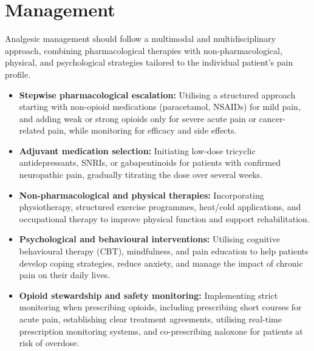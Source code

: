 \section*{Management}
Analgesic management should follow a multimodal and multidisciplinary approach, combining pharmacological therapies with non-pharmacological, physical, and psychological strategies tailored to the individual patient's pain profile.
\begin{itemize}
    \item \textbf{Stepwise pharmacological escalation:} Utilising a structured approach starting with non-opioid medications (paracetamol, NSAIDs) for mild pain, and adding weak or strong opioids only for severe acute pain or cancer-related pain, while monitoring for efficacy and side effects.
    \item \textbf{Adjuvant medication selection:} Initiating low-dose tricyclic antidepressants, SNRIs, or gabapentinoids for patients with confirmed neuropathic pain, gradually titrating the dose over several weeks.
    \item \textbf{Non-pharmacological and physical therapies:} Incorporating physiotherapy, structured exercise programmes, heat/cold applications, and occupational therapy to improve physical function and support rehabilitation.
    \item \textbf{Psychological and behavioural interventions:} Utilising cognitive behavioural therapy (CBT), mindfulness, and pain education to help patients develop coping strategies, reduce anxiety, and manage the impact of chronic pain on their daily lives.
    \item \textbf{Opioid stewardship and safety monitoring:} Implementing strict monitoring when prescribing opioids, including prescribing short courses for acute pain, establishing clear treatment agreements, utilising real-time prescription monitoring systems, and co-prescribing naloxone for patients at risk of overdose.
\end{itemize}

